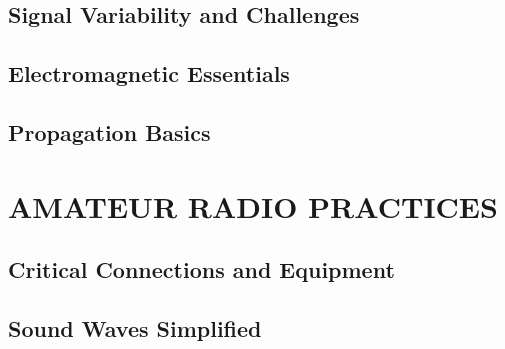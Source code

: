 \documentclass[12pt]{book}
\begin{document}
\section{Signal Variability and Challenges}












\section{Electromagnetic Essentials}











\section{Propagation Basics}











\chapter{AMATEUR RADIO PRACTICES}
\section{Critical Connections and Equipment}












\section{Sound Waves Simplified}












\end{document}

